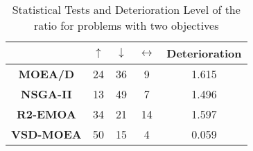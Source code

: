 
\begin{table}[t]
\centering
\caption{Statistical Tests and Deterioration Level of the \HV{} ratio for problems with two objectives}
\label{tab:Tests_HV_2obj}

\begin{scriptsize}
\begin{tabular}{c c|c|c|c}
\cline{2-5}
                                        & \textbf{$\uparrow$} & \textbf{$\downarrow$} & \textbf{$\leftrightarrow$} & \textbf{Deterioration} \\ \hline
\multicolumn{1}{c|}{\textbf{MOEA/D}}   & 24                  & 36                    & 9                          & 1.615         \\ \hline
\multicolumn{1}{c|}{\textbf{NSGA-II}}  & 13                  & 49                    & 7                          & 1.496         \\ \hline
\multicolumn{1}{c|}{\textbf{R2-EMOA}}  & 34                  & 21                    & 14                         & 1.597         \\ \hline
\multicolumn{1}{c|}{\textbf{VSD-MOEA}} & 50                  & 15                    & 4                          & 0.059         \\ \hline
\end{tabular}%
\end{scriptsize}
\end{table}


%
